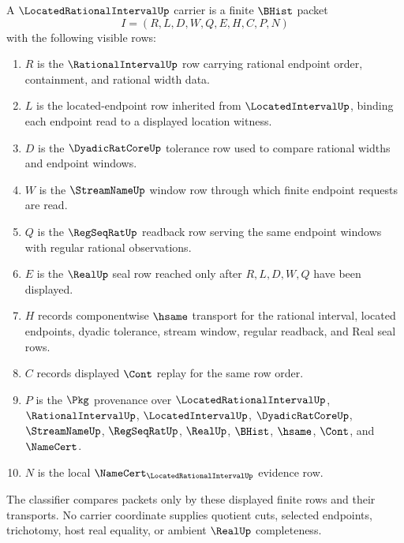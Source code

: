 \begin{definition}
\label{def:located-rational-interval-carrier}
A $\LocatedRationalIntervalUp$ carrier is a finite $\BHist$ packet
$$
I=(R,L,D,W,Q,E,H,C,P,N)
$$
with the following visible rows:
\begin{enumerate}
\item $R$ is the $\RationalIntervalUp$ row carrying rational endpoint order, containment, and rational width data.
\item $L$ is the located-endpoint row inherited from $\LocatedIntervalUp$, binding each endpoint read to a displayed location witness.
\item $D$ is the $\DyadicRatCoreUp$ tolerance row used to compare rational widths and endpoint windows.
\item $W$ is the $\StreamNameUp$ window row through which finite endpoint requests are read.
\item $Q$ is the $\RegSeqRatUp$ readback row serving the same endpoint windows with regular rational observations.
\item $E$ is the $\RealUp$ seal row reached only after $R,L,D,W,Q$ have been displayed.
\item $H$ records componentwise $\hsame$ transport for the rational interval, located endpoints, dyadic tolerance, stream window, regular readback, and Real seal rows.
\item $C$ records displayed $\Cont$ replay for the same row order.
\item $P$ is the $\Pkg$ provenance over $\LocatedRationalIntervalUp$, $\RationalIntervalUp$, $\LocatedIntervalUp$, $\DyadicRatCoreUp$, $\StreamNameUp$, $\RegSeqRatUp$, $\RealUp$, $\BHist$, $\hsame$, $\Cont$, and $\NameCert$.
\item $N$ is the local $\NameCert_{\LocatedRationalIntervalUp}$ evidence row.
\end{enumerate}
The classifier compares packets only by these displayed finite rows and their transports. No carrier coordinate supplies quotient cuts, selected endpoints, trichotomy, host real equality, or ambient $\RealUp$ completeness.
\end{definition}


